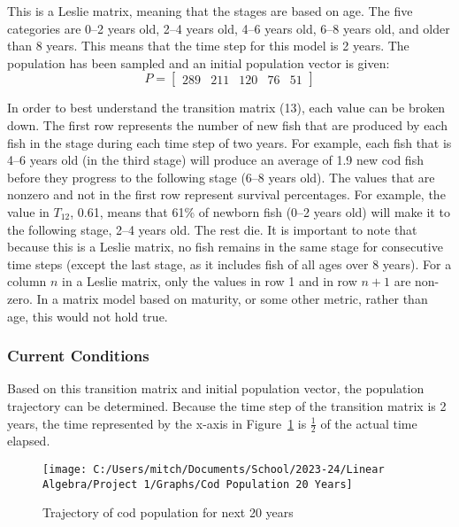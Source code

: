 \documentclass{article}
\begin{document}
    This is a Leslie matrix, meaning that the stages are based on age.
    The five categories are 0--2 years old, 2--4 years old, 4--6 years old, 6--8 years old, and older than 8 years.
    This means that the time step for this model is 2 years.
    The population has been sampled and an initial population vector is given:
    \begin{equation}
        P =
        \begin{bmatrix}
            289 & 211 & 120 & 76  & 51
        \end{bmatrix}\label{eq:equation14}
    \end{equation}

    In order to best understand the transition matrix (13), each value can be broken down.
    The first row represents the number of new fish that are produced by each fish in the stage during each time step of two years.
    For example, each fish that is 4--6 years old (in the third stage) will produce an average of 1.9 new cod fish before they progress to the following stage (6--8 years old).
    The values that are nonzero and not in the first row represent survival percentages.
    For example, the value in $T_{12}$, 0.61, means that 61\% of newborn fish (0--2 years old) will make it to the following stage, 2--4 years old.
    The rest die.
    It is important to note that because this is a Leslie matrix, no fish remains in the same stage for consecutive time steps (except the last stage, as it includes fish of all ages over 8 years).
    For a column $n$ in a Leslie matrix, only the values in row 1 and in row $n+1$ are non-zero.
    In a matrix model based on maturity, or some other metric, rather than age, this would not hold true.

    \subsubsection{Current Conditions}\label{subsubsec:current-conditions}

    \hspace{\parindent}Based on this transition matrix and initial population vector, the population trajectory can be determined.
    Because the time step of the transition matrix is 2 years, the time represented by the x-axis in Figure~\ref{fig:cod_traj_20} is $\frac{1}{2}$ of the actual time elapsed.
    \begin{figure} [!h]
        \centering
        \texttt{[image: C:/Users/mitch/Documents/School/2023-24/Linear Algebra/Project 1/Graphs/Cod Population 20 Years]}
        \caption{Trajectory of cod population for next 20 years}
        \label{fig:cod_traj_20}
    \end{figure}
\end{document}
